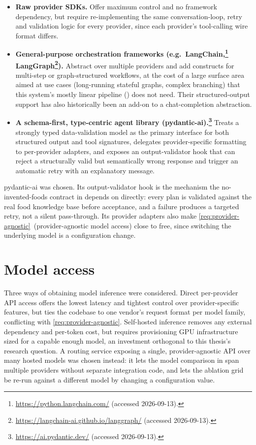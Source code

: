\begin{itemize}
    \item \textbf{Raw provider SDKs.} Offer maximum control and no framework dependency, but require re-implementing the same conversation-loop, retry and validation logic for every provider, since each provider's tool-calling wire format differs.
    \item \textbf{General-purpose orchestration frameworks (e.g.\ LangChain,\footnote{\url{https://python.langchain.com/} (accessed 2026-09-13).} LangGraph\footnote{\url{https://langchain-ai.github.io/langgraph/} (accessed 2026-09-13).}).} Abstract over multiple providers and add constructs for multi-step or graph-structured workflows, at the cost of a large surface area aimed at use cases (long-running stateful graphs, complex branching) that this system's mostly linear pipeline () does not need. Their structured-output support has also historically been an add-on to a chat-completion abstraction.
    \item \textbf{A schema-first, type-centric agent library (pydantic-ai).\footnote{\url{https://ai.pydantic.dev/} (accessed 2026-09-13).}} Treats a strongly typed data-validation model as the primary interface for both structured output and tool signatures, delegates provider-specific formatting to per-provider adapters, and exposes an output-validator hook that can reject a structurally valid but semantically wrong response and trigger an automatic retry with an explanatory message.
\end{itemize}

pydantic-ai was chosen. Its output-validator hook is the mechanism the no-invented-foods contract in  depends on directly: every plan is validated against the real food knowledge base before acceptance, and a failure produces a targeted retry, not a silent pass-through. Its provider adapters also make \ref{req:provider-agnostic}~(provider-agnostic model access) close to free, since switching the underlying model is a configuration change.

\section{Model access}
\label{sec:tools-model-access}

Three ways of obtaining model inference were considered. Direct per-provider API access offers the lowest latency and tightest control over provider-specific features, but ties the codebase to one vendor's request format per model family, conflicting with \ref{req:provider-agnostic}. Self-hosted inference removes any external dependency and per-token cost, but requires provisioning GPU infrastructure sized for a capable enough model, an investment orthogonal to this thesis's research question. A routing service exposing a single, provider-agnostic API over many hosted models was chosen instead: it lets the model comparison in  span multiple providers without separate integration code, and lets the ablation grid be re-run against a different model by changing a configuration value.

